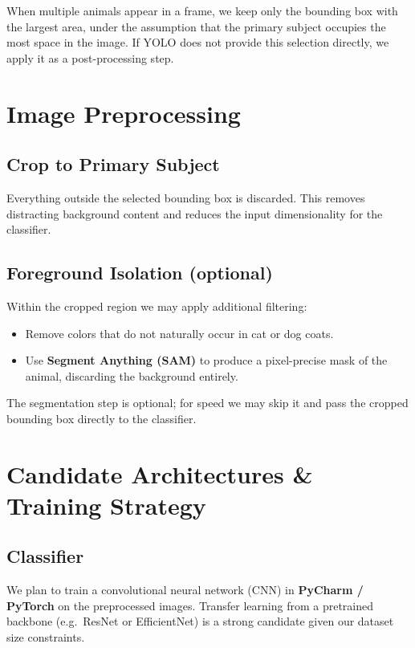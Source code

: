 \documentclass[10pt,twocolumn]{article}
\begin{document}
When multiple animals appear in a frame, we keep only the bounding box with
the largest area, under the assumption that the primary subject occupies the
most space in the image. If YOLO does not provide this selection directly, we
apply it as a post-processing step.

\section{Image Preprocessing}

\subsection{Crop to Primary Subject}

Everything outside the selected bounding box is discarded. This removes
distracting background content and reduces the input dimensionality for the
classifier.

\subsection{Foreground Isolation (optional)}

Within the cropped region we may apply additional filtering:

\begin{itemize}[noitemsep]
  \item Remove colors that do not naturally occur in cat or dog coats.
  \item Use \textbf{Segment Anything (SAM)} to produce a pixel-precise mask of
        the animal, discarding the background entirely.
\end{itemize}

The segmentation step is optional; for speed we may skip it and pass the
cropped bounding box directly to the classifier.

\section{Candidate Architectures \& Training Strategy}

\subsection{Classifier}

We plan to train a convolutional neural network (CNN) in \textbf{PyCharm /
PyTorch} on the preprocessed images. Transfer learning from a pretrained
backbone (e.g.\ ResNet or EfficientNet) is a strong candidate given our
dataset size constraints.
\end{document}
